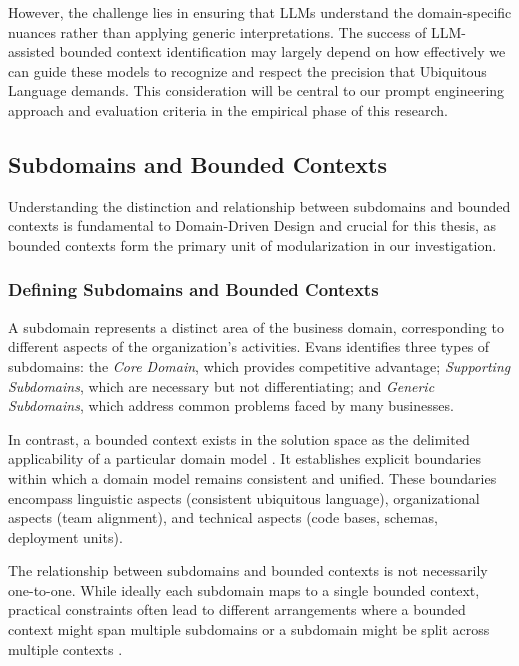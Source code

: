 However, the challenge lies in ensuring that LLMs understand the domain-specific nuances rather than applying generic interpretations. The success of LLM-assisted bounded context identification may largely depend on how effectively we can guide these models to recognize and respect the precision that Ubiquitous Language demands. This consideration will be central to our prompt engineering approach and evaluation criteria in the empirical phase of this research.

\subsection{Subdomains and Bounded Contexts}
Understanding the distinction and relationship between subdomains and bounded contexts is fundamental to Domain-Driven Design and crucial for this thesis, as bounded contexts form the primary unit of modularization in our investigation.

\subsubsection{Defining Subdomains and Bounded Contexts}

A subdomain represents a distinct area of the business domain, corresponding to different aspects of the organization's activities. Evans \autocite{Evans2003} identifies three types of subdomains: the \textit{Core Domain}, which provides competitive advantage; \textit{Supporting Subdomains}, which are necessary but not differentiating; and \textit{Generic Subdomains}, which address common problems faced by many businesses.

In contrast, a bounded context exists in the solution space as the delimited applicability of a particular domain model \autocite{Evans2003}. It establishes explicit boundaries within which a domain model remains consistent and unified. These boundaries encompass linguistic aspects (consistent ubiquitous language), organizational aspects (team alignment), and technical aspects (code bases, schemas, deployment units).

The relationship between subdomains and bounded contexts is not necessarily one-to-one. While ideally each subdomain maps to a single bounded context, practical constraints often lead to different arrangements where a bounded context might span multiple subdomains or a subdomain might be split across multiple contexts \autocite{Evans2003}.

